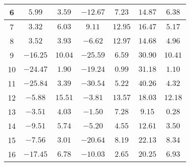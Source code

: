 \begin{table}[H]
\begin{tabular}{|c|c|c|c|c|c|c|}
                        6   &  $5.99$    &  $3.59$   &  $-12.67$  &  $7.23$   &  $14.87$  &  $6.38$  \\ \hline
                        7   &  $3.32$    &  $6.03$   &  $9.11$    &  $12.95$  &  $16.47$  &  $5.17$  \\ \hline
                        8   &  $3.52$    &  $3.93$   &  $-6.62$   &  $12.97$  &  $14.68$  &  $4.96$  \\ \hline
                        9   &  $-16.25$  &  $10.04$  &  $-25.59$  &  $6.59$   &  $30.90$  &  $10.41$ \\ \hline
                        10  &  $-24.47$  &  $1.90$   &  $-19.24$  &  $0.99$   &  $31.18$  &  $1.10$  \\ \hline
                        11  &  $-25.84$  &  $3.39$   &  $-30.54$  &  $5.22$   &  $40.26$  &  $4.32$  \\ \hline
                        12  &  $-5.88$   &  $15.51$  &  $-3.81$   &  $13.57$  &  $18.03$  &  $12.18$ \\ \hline
                        13  &  $-3.51$   &  $4.03$   &  $-1.50$   &  $7.28$   &  $9.15$   &  $0.28$  \\ \hline
                        14  &  $-9.51$   &  $5.74$   &  $-5.20$   &  $4.55$   &  $12.61$  &  $3.50$  \\ \hline
                        15  &  $-7.56$   &  $3.01$   &  $-20.64$  &  $8.19$   &  $22.13$  &  $8.34$  \\ \hline
                        16  &  $-17.45$  &  $6.78$   &  $-10.03$  &  $2.65$   &  $20.25$  &  $6.93$  \\ \hline
                    \end{tabular}
    \label{tab:media_fisica_8_total}
\end{table}